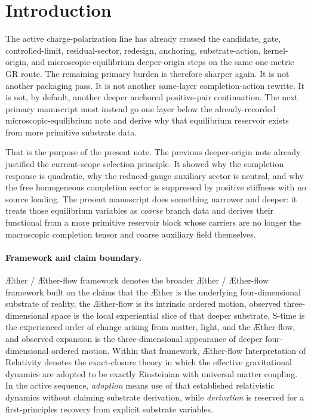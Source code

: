 \documentclass[11pt]{article}
\newcommand{\Aether}{\AE{}ther}
\newcommand{\Aflow}{\AE{}ther-flow}
\newcommand{\TheoryName}{\Aflow{} Interpretation of Relativity}
\newcommand{\TheoryProgram}{\Aether{} / \Aflow{} framework}
\begin{document}
\section{Introduction}

The active charge-polarization line has already crossed the candidate, gate, controlled-limit, residual-sector, redesign, anchoring, substrate-action, kernel-origin, and microscopic-equilibrium deeper-origin steps on the same one-metric GR route. The remaining primary burden is therefore sharper again. It is not another packaging pass. It is not another same-layer completion-action rewrite. It is not, by default, another deeper anchored positive-pair continuation. The next primary manuscript must instead go one layer below the already-recorded microscopic-equilibrium note and derive why that equilibrium reservoir exists from more primitive substrate data.

That is the purpose of the present note. The previous deeper-origin note already justified the current-scope selection principle. It showed why the completion response is quadratic, why the reduced-gauge auxiliary sector is neutral, and why the free homogeneous completion sector is suppressed by positive stiffness with no source loading. The present manuscript does something narrower and deeper: it treats those equilibrium variables as \emph{coarse} branch data and derives their functional from a more primitive reservoir block whose carriers are no longer the macroscopic completion tensor and coarse auxiliary field themselves.

\paragraph{Framework and claim boundary.}
\TheoryProgram{} denotes the broader \Aether{} / \Aflow{} framework built on the claims that the \Aether{} is the underlying four-dimensional substrate of reality, the \Aflow{} is its intrinsic ordered motion, observed three-dimensional space is the local experiential slice of that deeper substrate, S-time is the experienced order of change arising from matter, light, and the \Aflow{}, and observed expansion is the three-dimensional appearance of deeper four-dimensional ordered motion. Within that framework, \TheoryName{} denotes the exact-closure theory in which the effective gravitational dynamics are adopted to be exactly Einsteinian with universal matter coupling. In the active sequence, \emph{adoption} means use of that established relativistic dynamics without claiming substrate derivation, while \emph{derivation} is reserved for a first-principles recovery from explicit substrate variables.
\end{document}
